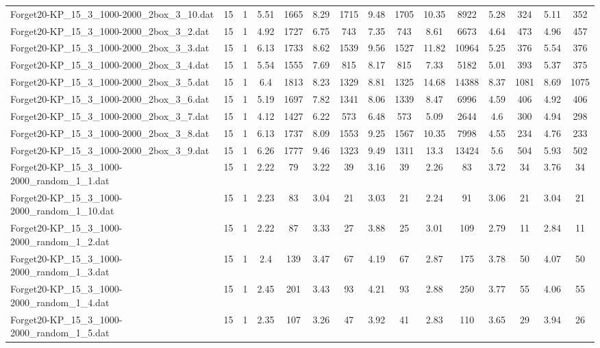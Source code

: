 \begin{table}[!ht]
{\begin{tabular}{lcccccccccccccc}
Forget20-KP\_15\_3\_1000-2000\_2box\_3\_10.dat & 15 & 1 & 5.51 & 1665 & 8.29 & 1715 & 9.48 & 1705 & 10.35 & 8922 & 5.28 & 324 & 5.11 & 352 \\
Forget20-KP\_15\_3\_1000-2000\_2box\_3\_2.dat & 15 & 1 & 4.92 & 1727 & 6.75 & 743 & 7.35 & 743 & 8.61 & 6673 & 4.64 & 473 & 4.96 & 457 \\
Forget20-KP\_15\_3\_1000-2000\_2box\_3\_3.dat & 15 & 1 & 6.13 & 1733 & 8.62 & 1539 & 9.56 & 1527 & 11.82 & 10964 & 5.25 & 376 & 5.54 & 376 \\
Forget20-KP\_15\_3\_1000-2000\_2box\_3\_4.dat & 15 & 1 & 5.54 & 1555 & 7.69 & 815 & 8.17 & 815 & 7.33 & 5182 & 5.01 & 393 & 5.37 & 375 \\
Forget20-KP\_15\_3\_1000-2000\_2box\_3\_5.dat & 15 & 1 & 6.4 & 1813 & 8.23 & 1329 & 8.81 & 1325 & 14.68 & 14388 & 8.37 & 1081 & 8.69 & 1075 \\
Forget20-KP\_15\_3\_1000-2000\_2box\_3\_6.dat & 15 & 1 & 5.19 & 1697 & 7.82 & 1341 & 8.06 & 1339 & 8.47 & 6996 & 4.59 & 406 & 4.92 & 406 \\
Forget20-KP\_15\_3\_1000-2000\_2box\_3\_7.dat & 15 & 1 & 4.12 & 1427 & 6.22 & 573 & 6.48 & 573 & 5.09 & 2644 & 4.6 & 300 & 4.94 & 298 \\
Forget20-KP\_15\_3\_1000-2000\_2box\_3\_8.dat & 15 & 1 & 6.13 & 1737 & 8.09 & 1553 & 9.25 & 1567 & 10.35 & 7998 & 4.55 & 234 & 4.76 & 233 \\
Forget20-KP\_15\_3\_1000-2000\_2box\_3\_9.dat & 15 & 1 & 6.26 & 1777 & 9.46 & 1323 & 9.49 & 1311 & 13.3 & 13424 & 5.6 & 504 & 5.93 & 502 \\
Forget20-KP\_15\_3\_1000-2000\_random\_1\_1.dat & 15 & 1 & 2.22 & 79 & 3.22 & 39 & 3.16 & 39 & 2.26 & 83 & 3.72 & 34 & 3.76 & 34 \\
Forget20-KP\_15\_3\_1000-2000\_random\_1\_10.dat & 15 & 1 & 2.23 & 83 & 3.04 & 21 & 3.03 & 21 & 2.24 & 91 & 3.06 & 21 & 3.04 & 21 \\
Forget20-KP\_15\_3\_1000-2000\_random\_1\_2.dat & 15 & 1 & 2.22 & 87 & 3.33 & 27 & 3.88 & 25 & 3.01 & 109 & 2.79 & 11 & 2.84 & 11 \\
Forget20-KP\_15\_3\_1000-2000\_random\_1\_3.dat & 15 & 1 & 2.4 & 139 & 3.47 & 67 & 4.19 & 67 & 2.87 & 175 & 3.78 & 50 & 4.07 & 50 \\
Forget20-KP\_15\_3\_1000-2000\_random\_1\_4.dat & 15 & 1 & 2.45 & 201 & 3.43 & 93 & 4.21 & 93 & 2.88 & 250 & 3.77 & 55 & 4.06 & 55 \\
Forget20-KP\_15\_3\_1000-2000\_random\_1\_5.dat & 15 & 1 & 2.35 & 107 & 3.26 & 47 & 3.92 & 41 & 2.83 & 110 & 3.65 & 29 & 3.94 & 26 \\

\end{tabular}}
\end{table}
